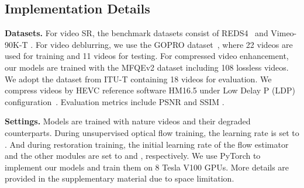 \documentclass[nohyperref]{article}
\theoremstyle{plain}
\theoremstyle{definition}
\theoremstyle{remark}
\begin{document}
\subsection{Implementation Details}
\vspace{-1mm}
\noindent\textbf{Datasets.}  For video SR, the benchmark datasets consist of REDS4~\cite{r58} and Vimeo-90K-T \cite{r19}. For video deblurring, we use the GOPRO dataset~\cite{r74}, where 22 videos are used for training and 11 videos for testing. For compressed video enhancement, our models are trained with the MFQEv2 dataset \cite{r12} including 108 lossless videos. We adopt the dataset from ITU-T \cite{r57} containing 18 videos for evaluation. We compress videos by HEVC reference software HM16.5 under Low Delay P (LDP) configuration~\cite{r12,deng2020spatio}. Evaluation metrics include PSNR and SSIM \cite{r60}.

\noindent\textbf{Settings.} Models are trained with nature videos and their degraded counterparts. During unsupervised optical flow training, the learning rate is set to . And during restoration training, the initial learning rate of the flow estimator and the other modules are set to  and , respectively. We use PyTorch to implement our models and train them on 8 Tesla V100 GPUs. More details are provided in the supplementary material due to space limitation.
\end{document}
